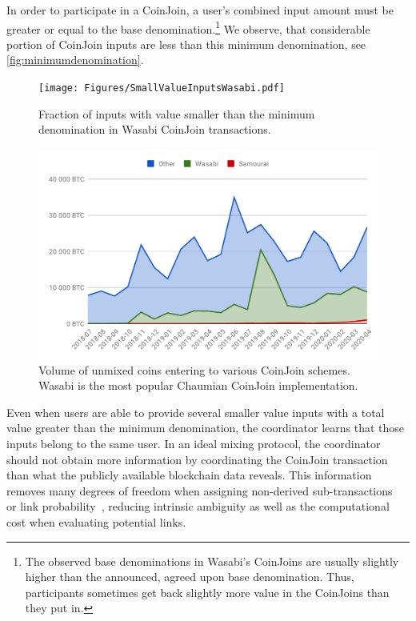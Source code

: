 \documentclass[a4paper]{article}
\begin{document}
In order to participate in a CoinJoin, a user's combined input amount must be greater or equal to the base denomination.\footnote{The observed base denominations in Wasabi's CoinJoins are usually slightly higher than the announced, agreed upon base denomination. Thus, participants sometimes get back slightly more value in the CoinJoins than they put in.} We observe, that considerable portion of CoinJoin inputs are less than this minimum denomination, see \cref{fig:minimumdenomination}.

\begin{figure}%
\centering
\begin{minipage}{.45\textwidth}
    \centering
    \texttt{[image: Figures/SmallValueInputsWasabi.pdf]}
    \caption{Fraction of inputs with value smaller than the minimum denomination in Wasabi CoinJoin transactions.}
    \label{fig:minimumdenomination}
\end{minipage}
\hspace{6pt}
\begin{minipage}{.45\textwidth}
    \centering
    \includegraphics[width=0.95\linewidth]{Figures/freshBitcoins.pdf}
    \caption{Volume of unmixed coins entering to various CoinJoin schemes. Wasabi is the most popular Chaumian CoinJoin implementation.}
    \label{fig:freshBitcoins}
\end{minipage}
\end{figure}

Even when users are able to provide several smaller value inputs with a total value greater than the minimum denomination, the coordinator learns that those inputs belong to the same user. In an ideal mixing protocol, the coordinator should not obtain more information by coordinating the CoinJoin transaction than what the publicly available blockchain data reveals. This information removes many degrees of freedom when assigning non-derived sub-transactions~\cite{maurer2017anonymous} or link probability~\cite{laurentmt2015bitcoin}, reducing intrinsic ambiguity as well as the computational cost when evaluating potential links.
\end{document}
